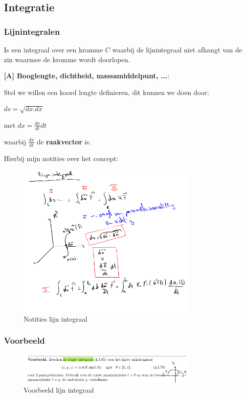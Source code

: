 \documentclass[a4paper]{report}
\begin{document}
\subsection{Integratie}

\subsubsection{Lijnintegralen}

Is een integraal over een kromme $C$ waarbij de lijnintegraal niet afhangt van de zin waarmee de kromme wordt doorlopen.

\textbf{[A] Booglengte, dichtheid, massamiddelpunt, ...}:

Stel we willen een koord lengte definieren, dit kunnen we doen door:

$ds = \sqrt{dx . dx}$

met $dx = \frac{dx}{dt} dt$

waarbij $\frac{dx}{dt}$ de \textbf{raakvector} is.

Hierbij mijn notities over het concept:


\begin{figure}[H]
	\centering
	\includegraphics[width=0.8\textwidth]{assets/notities_lijn_integraal.png}
	\caption{Notities lijn integraal}
	\label{fig:notities_lijn_integraal}
\end{figure}

\subsubsection{Voorbeeld}

\begin{figure}[H]
	\centering
	\includegraphics[width=0.8\textwidth]{assets/voorbeeld_lijn_integraal.png}
	\caption{Voorbeeld lijn integraal}
	\label{fig:voorbeeld_lijn_integraal}
\end{figure}
\end{document}
